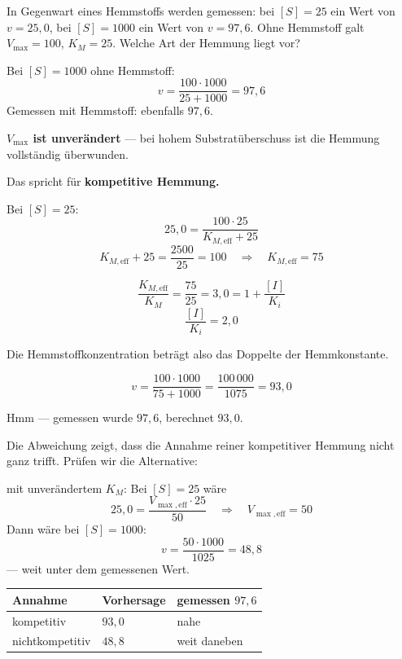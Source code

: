 \begin{aufgabe}
In Gegenwart eines Hemmstoffs werden gemessen: bei $[S]=25$ ein Wert von $v=25{,}0$, bei $[S]=1000$ ein Wert von $v=97{,}6$. Ohne Hemmstoff galt $V_{\max}=100$, $K_M=25$. Welche Art der Hemmung liegt vor?

\loesung
{}
Bei $[S]=1000$ ohne Hemmstoff:
\[ v = \frac{100 \cdot 1000}{25+1000} = 97{,}6 \]
Gemessen mit Hemmstoff: ebenfalls $97{,}6$.

\begin{center}
\begin{minipage}{0.9\textwidth}
\textbf{$V_{\max}$ ist unverändert} --- bei hohem Substratüberschuss ist die Hemmung vollständig überwunden.
\end{minipage}
\end{center}

Das spricht für \textbf{kompetitive Hemmung.}

Bei $[S]=25$:
\[ 25{,}0 = \frac{100 \cdot 25}{K_{M,\text{eff}}+25} \]
\[ K_{M,\text{eff}}+25 = \frac{2500}{25} = 100 \quad\Longrightarrow\quad K_{M,\text{eff}} = 75 \]

\[ \frac{K_{M,\text{eff}}}{K_M} = \frac{75}{25} = 3{,}0 = 1 + \frac{[I]}{K_i} \]
\[ \frac{[I]}{K_i} = 2{,}0 \]

Die Hemmstoffkonzentration beträgt also das Doppelte der Hemmkonstante.

\[ v = \frac{100 \cdot 1000}{75+1000} = \frac{100\,000}{1075} = 93{,}0 \]

Hmm --- gemessen wurde $97{,}6$, berechnet $93{,}0$.

Die Abweichung zeigt, dass die Annahme reiner kompetitiver Hemmung nicht ganz trifft. Prüfen wir die Alternative:

 mit unverändertem $K_M$: Bei $[S]=25$ wäre
\[ 25{,}0 = \frac{V_{\max,\text{eff}}\cdot25}{50} \quad\Longrightarrow\quad V_{\max,\text{eff}} = 50 \]
Dann wäre bei $[S]=1000$:
\[ v = \frac{50\cdot1000}{1025} = 48{,}8 \]
--- weit unter dem gemessenen Wert.

\begin{center}
\renewcommand{\arraystretch}{1.48}
\begin{tabular}{@{}P{2.8cm}P{2.2cm}P{2.4cm}@{}}
\toprule
\textbf{Annahme} & \textbf{Vorhersage} & \textbf{gemessen $97{,}6$}\\
\midrule
kompetitiv & $93{,}0$ & \textcolor{gruen}{nahe}\\
nichtkompetitiv & $48{,}8$ & \textcolor{akzent}{weit daneben}\\
\bottomrule
\end{tabular}
\end{center}


\end{aufgabe}
